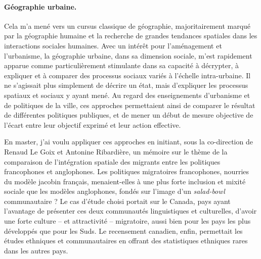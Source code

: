 \paragraph{Géographie urbaine.}
Cela m'a mené vers un cursus classique de géographie, majoritairement marqué par la géographie humaine et la recherche de grandes tendances spatiales dans les interactions sociales humaines.
Avec un intérêt pour l'aménagement et l'urbanisme, la géographie urbaine, dans sa dimension sociale, m'est rapidement apparue comme particulièrement stimulante dans sa capacité à décrypter, à expliquer et à comparer des processus sociaux variés à l'échelle intra-urbaine.
Il ne s'agissait plus simplement de décrire un état, mais d'expliquer les processus spatiaux et sociaux y ayant mené.
Au regard des enseignements d'urbanisme et de politiques de la ville, ces approches permettaient ainsi de comparer le résultat de différentes politiques publiques, et de mener un début de mesure objective de l'écart entre leur objectif exprimé et leur action effective.

En master, j'ai voulu appliquer ces approches en initiant, sous la co-direction de Renaud Le Goix et Antonine Ribardière, un mémoire sur le thème de la comparaison de l'intégration spatiale des migrants entre les politiques francophones et anglophones.
Les politiques migratoires francophones, nourries du modèle jacobin français, menaient-elles à une plus forte inclusion et mixité sociale que les modèles anglophones, fondés sur l'image d'un \og \textit{salad-bowl}\fg{} communautaire ?
Le cas d'étude choisi portait sur le Canada, pays ayant l'avantage de présenter ces deux communautés linguistiques et culturelles, d'avoir une forte culture -- et attractivité -- migratoire, aussi bien pour les pays les plus développés que pour les Suds.
Le recensement canadien, enfin, permettait les études ethniques et communautaires en offrant des statistiques ethniques rares dans les autres pays.

